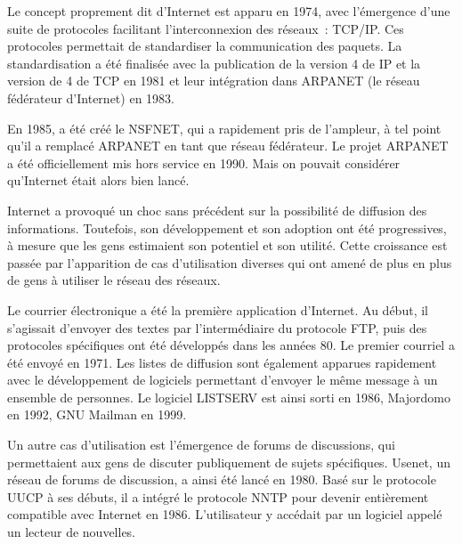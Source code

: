 Le concept proprement dit d'Internet est apparu en 1974, avec l'émergence d'une suite de protocoles facilitant l'interconnexion des réseaux~: TCP/IP. Ces protocoles permettait de standardiser la communication des paquets. La standardisation a été finalisée avec la publication de la version 4 de IP et la version de 4 de TCP en 1981 et leur intégration dans ARPANET (le réseau fédérateur d'Internet) en 1983.

En 1985, a été créé le NSFNET, qui a rapidement pris de l'ampleur, à tel point qu'il a remplacé ARPANET en tant que réseau fédérateur. Le projet ARPANET a été officiellement mis hors service en 1990. Mais on pouvait considérer qu'Internet était alors bien lancé.


Internet a provoqué un choc sans précédent sur la possibilité de diffusion des informations. Toutefois, son développement et son adoption ont été progressives, à mesure que les gens estimaient son potentiel et son utilité. Cette croissance est passée par l'apparition de cas d'utilisation diverses qui ont amené de plus en plus de gens à utiliser le réseau des réseaux.

Le courrier électronique a été la première application d'Internet. Au début, il s'agissait d'envoyer des textes par l'intermédiaire du protocole FTP, puis des protocoles spécifiques ont été développés dans les années 80. Le premier courriel a été envoyé en 1971. Les listes de diffusion sont également apparues rapidement avec le développement de logiciels permettant d'envoyer le même message à un ensemble de personnes. Le logiciel LISTSERV est ainsi sorti en 1986, Majordomo en 1992, GNU Mailman en 1999.

Un autre cas d'utilisation est l'émergence de forums de discussions, qui permettaient aux gens de discuter publiquement de sujets spécifiques. Usenet, un réseau de forums de discussion, a ainsi été lancé en 1980. Basé sur le protocole UUCP à ses débuts, il a intégré le protocole NNTP pour devenir entièrement compatible avec Internet en 1986. L'utilisateur y accédait par un logiciel appelé un lecteur de nouvelles.

